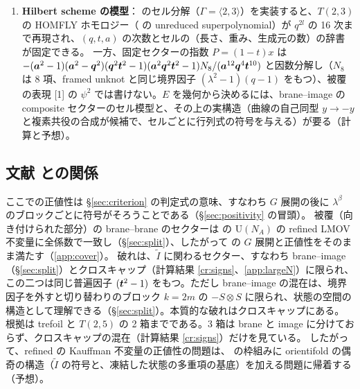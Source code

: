 \begin{enumerate}
\item \textbf{Hilbert scheme の模型}：\cite{ORS12} のセル分解（$\Gamma = \langle 2, 3\rangle$）を実装すると、$T(2,3)$ の HOMFLY ホモロジー（\cite{DGR05} の unreduced superpolynomial）が $q^{2l}$ の 16 次まで再現され、$(q, t, a)$ の次数とセルの（長さ、重み、生成元の数）の辞書が固定できる。
一方、固定セクターの指数 $P = (1-t)x$ は $-(\bm{a}^2 - 1)(\bm{a}^2 - \bm{q}^2)(\bm{q}^2\bm{t}^2 - 1)(\bm{a}^2\bm{q}^2\bm{t}^2 - 1) N_8/(\bm{a}^{12}\bm{q}^4\bm{t}^{10})$ と因数分解し（$N_8$ は 8 項、framed unknot と同じ境界因子 $(\lambda^2-1)(q-1)$ をもつ）、被覆の表現 [1] の $\psi^2$ では書けない。$E$ を幾何から決めるには、brane--image の composite セクターのセル模型と、その上の実構造（曲線の自己同型 $y \to -y$ と複素共役の合成が候補で、セルごとに行列式の符号を与える）が要る（計算と予想）。
\end{enumerate}

\subsection{文献 \texorpdfstring{\cite{KN17}}{[KN17]} との関係}\label{sec:kn}
ここでの正値性は §\ref{sec:criterion} の判定式の意味、すなわち $G$ 展開の後に $\lambda^\beta$ のブロックごとに符号がそろうことである（§\ref{sec:positivity} の冒頭）。
被覆（向き付けられた部分）の brane--brane のセクターは \cite{KN17} の U$(N_A)$ の refined LMOV 不変量に全係数で一致し（§\ref{sec:split}）、したがって \cite{KN17} の $G$ 展開と正値性をそのまま満たす（\ref{app:cover}）。
破れは、$\tilde I$ に関わるセクター、すなわち brane--image（§\ref{sec:split}）とクロスキャップ（計算結果 \ref{cr:signs}、\ref{app:largeN}）に限られ、この二つは同じ普遍因子 $(\bm{t}^2 - 1)$ をもつ。ただし brane--image の混在は、境界因子を外すと切り替わりのブロック $k = 2m$ の $-S\otimes S$ に限られ、状態の空間の構造として理解できる（§\ref{sec:split}）。本質的な破れはクロスキャップにある。
根拠は trefoil と $T(2,5)$ の 2 箱までである。3 箱は brane と image に分けておらず、クロスキャップの混在（計算結果 \ref{cr:signs}）だけを見ている。
したがって、refined の Kauffman 不変量の正値性の問題は、\cite{KN17} の枠組みに orientifold の偶奇の構造（$\tilde I$ の符号と、凍結した状態の多重項の基底）を加える問題に帰着する（予想）。
